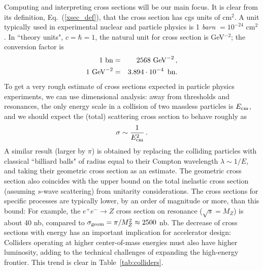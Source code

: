 \documentclass{ws-procs9x6}
\def\beq{\begin{equation}}
\def\eeq#1{\label{#1}\end{equation}}
\def\beqa{\begin{eqnarray}}
\def\eeqa#1{\label{#1}\end{eqnarray}}
\def\CR{\nonumber \\ }
\def\leqn#1{(\ref{#1})}
\begin{document}
Computing and interpreting cross sections will be our main focus. It is clear from its definition, Eq.~\leqn{xsec_def}, that the cross section has cgs units of cm$^2$. A unit typically used in experimental nuclear and particle physics is 1 {\it barn} $=10^{-24}$ cm$^2$. In ``theory units", $c=\hbar=1$, the natural unit for cross section is GeV$^{-2}$; the conversion factor is
\beqa
1~{\rm bn} &=& 2568~{\rm GeV}^{-2}\,,\CR
1~{\rm GeV}^{-2} &=& 3.894\cdot 10^{-4}\,~{\rm bn}.
\eeqa{bn_GeV_convert}
To get a very rough estimate of cross sections expected in particle physics experiments, we can use dimensional analysis: away from thresholds and resonances, the only energy scale in a collision of two massless particles is $E_{\rm cm}$, and we should expect the (total) scattering cross section to behave roughly as 
\beq
\sigma \sim \frac{1}{E_{\rm cm}^2}\,.
\eeq{xsec_scaling}
A similar result (larger by $\pi$) is obtained by replacing the colliding particles with classical ``billiard balls" of radius equal to their Compton wavelength $\lambda \sim 1/E$, and taking their geometric cross section as an estimate. The geometric cross section also coincides with the upper bound on the total inelastic cross section (assuming $s$-wave scattering) from unitarity considerations. The cross sections for specific processes are typically lower, by an order of magnitude or more, than this bound: For example, the $e^+e^-\to Z$ cross section on resonance ($\sqrt{s}=M_Z$) is about 40 nb, compared to $\sigma_{\rm geom} = \pi/M_Z^2 \approx 2500$ nb. 
The decrease of cross sections with energy has an important implication for accelerator design: Colliders operating at higher center-of-mass energies must also have higher luminosity, adding to the technical challenges of expanding the high-energy frontier. This trend is clear in Table~\ref{tab:colliders}. 
\end{document}
